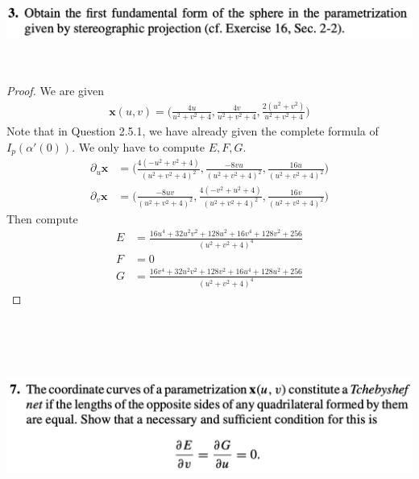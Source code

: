 \documentclass{report}
\begin{document}
\begin{question}{}{}
\includegraphics[height=3cm,width=18cm]{hw4q9}
\end{question}
\begin{proof}
We are given 
\begin{align*}
\textbf{x}(u,v)=\Big(\frac{4u}{u^2+v^2+4}, \frac{4v}{u^2+v^2+4}, \frac{2(u^2+v^2)}{u^2+v^2+4} \Big)
\end{align*}
Note that in Question 2.5.1, we have already given the complete formula of $I_p(\alpha '(0))$. We only have to compute $E,F,G$. 
\begin{align*}
\partial_u \textbf{x}&=\Big(\frac{4(-u^2+v^2+4)}{(u^2+v^2+4)^2}, \frac{-8vu}{(u^2+v^2+4)^2}, \frac{16u}{(u^2+v^2+4)^2} \Big)\\
\partial_v \textbf{x}&=\Big(\frac{-8uv}{(u^2+v^2+4)^2}, \frac{4(-v^2+u^2+4)}{(u^2+v^2+4)^2},\frac{16v}{(u^2+v^2+4)^2} \Big)
\end{align*}
Then compute 
\begin{align*}
E&= \frac{16u^4+32u^2v^2+128u^2+16v^4+128v^2+256}{(u^2+v^2+4)^4}\\
F&=0\\
G&= \frac{16 v^4 + 32u^2v^2+ 128 v^2 + 16u^4 + 128 u^2 +256}{(u^2+v^2+4)^4}
\end{align*}
\end{proof}
\begin{question}{}{}
\includegraphics[height=7cm,width=18cm]{hw4q10}
\end{question}
\end{document}
